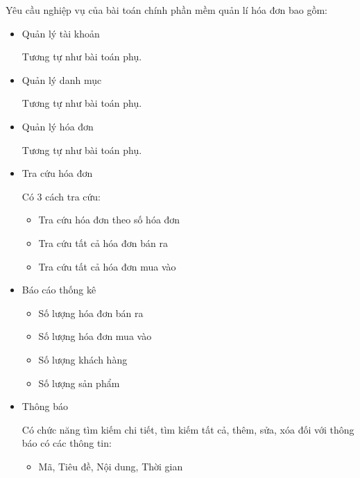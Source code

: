 Yêu cầu nghiệp vụ của bài toán chính phần mềm quản lí hóa đơn bao gồm:

\begin{itemize}

\item Quản lý tài khoản

Tương tự như bài toán phụ.

\item Quản lý danh mục

Tương tự như bài toán phụ.

\item Quản lý hóa đơn

Tương tự như bài toán phụ.

\item Tra cứu hóa đơn

Có 3 cách tra cứu:

\begin{itemize}

\item Tra cứu hóa đơn theo số hóa đơn

\item Tra cứu tất cả hóa đơn bán ra

\item Tra cứu tất cả hóa đơn mua vào

\end{itemize}

\item Báo cáo thống kê

\begin{itemize}

\item Số lượng hóa đơn bán ra

\item Số lượng hóa đơn mua vào

\item Số lượng khách hàng

\item Số lượng sản phẩm

\end{itemize}

\item Thông báo

Có chức năng tìm kiếm chi tiết, tìm kiếm tất cả, thêm, sửa, xóa đối với thông báo có các thông tin:

\begin{itemize}

\item Mã, Tiêu đề, Nội dung, Thời gian


\end{itemize}
\end{itemize}
